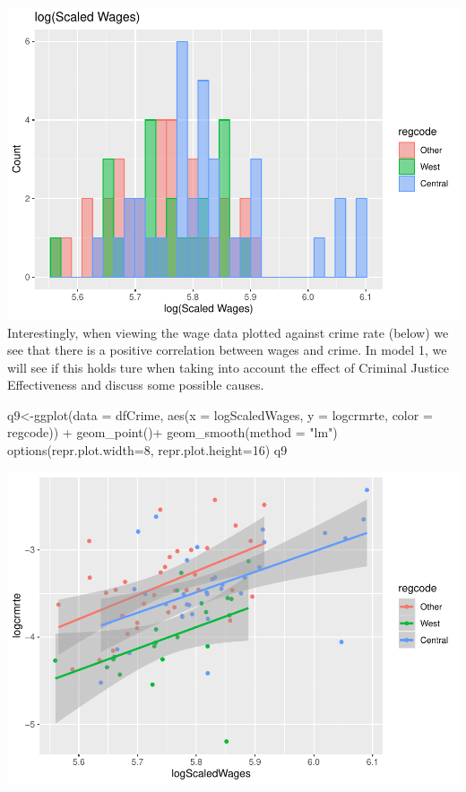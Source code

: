 \documentclass[]{article}
\newenvironment{Shaded}{}{}
\newcommand{\DataTypeTok}[1]{#1}
\newcommand{\DecValTok}[1]{#1}
\newcommand{\KeywordTok}[1]{\textcolor[rgb]{0.00,0.00,1.00}{#1}}
\newcommand{\NormalTok}[1]{#1}
\newcommand{\OperatorTok}[1]{#1}
\newcommand{\StringTok}[1]{\textcolor[rgb]{0.00,0.50,0.50}{#1}}
\begin{document}
\includegraphics{Bagnard_Gaustad_Hartman_Leung_Lab_3_files/figure-latex/unnamed-chunk-55-1.pdf}
Interestingly, when viewing the wage data plotted against crime rate
(below) we see that there is a positive correlation between wages and
crime. In model 1, we will see if this holds ture when taking into
account the effect of Criminal Justice Effectiveness and discuss some
possible causes.

\begin{Shaded}
\begin{Highlighting}[]
\NormalTok{q9<-}\KeywordTok{ggplot}\NormalTok{(}\DataTypeTok{data =}\NormalTok{ dfCrime, }\KeywordTok{aes}\NormalTok{(}\DataTypeTok{x =}\NormalTok{ logScaledWages, }\DataTypeTok{y =}\NormalTok{ logcrmrte, }\DataTypeTok{color =}\NormalTok{ regcode)) }\OperatorTok{+}
\StringTok{      }\KeywordTok{geom_point}\NormalTok{()}\OperatorTok{+}
\StringTok{  }\KeywordTok{geom_smooth}\NormalTok{(}\DataTypeTok{method =} \StringTok{"lm"}\NormalTok{)}
\KeywordTok{options}\NormalTok{(}\DataTypeTok{repr.plot.width=}\DecValTok{8}\NormalTok{, }\DataTypeTok{repr.plot.height=}\DecValTok{16}\NormalTok{)}
\NormalTok{q9}
\end{Highlighting}
\end{Shaded}

\includegraphics{Bagnard_Gaustad_Hartman_Leung_Lab_3_files/figure-latex/unnamed-chunk-56-1.pdf}
\end{document}
